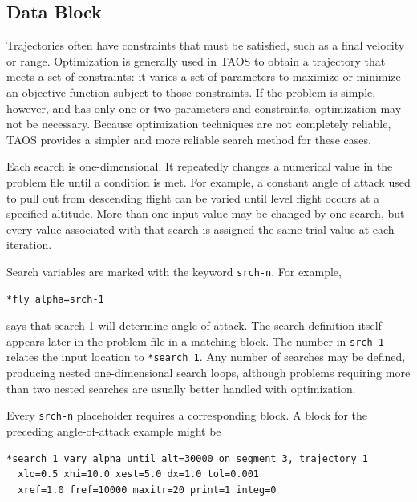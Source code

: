 \subsection{ Data Block}\label{sec:block-search}

Trajectories often have constraints that must be satisfied, such as a final velocity or
range. Optimization is generally used in TAOS to obtain a trajectory that meets a set
of constraints: it varies a set of parameters to maximize or minimize an objective
function subject to those constraints. If the problem is simple, however, and has only
one or two parameters and constraints, optimization may not be necessary. Because
optimization techniques are not completely reliable, TAOS provides a simpler and
more reliable search method for these cases.


Each search is one-dimensional. It repeatedly changes a numerical value in the
problem file until a condition is met. For example, a constant angle of attack used to
pull out from descending flight can be varied until level flight occurs at a specified
altitude. More than one input value may be changed by one search, but every value
associated with that search is assigned the same trial value at each iteration.

Search variables are marked with the keyword \texttt{srch-n}. For example,

\begin{lstlisting}[style=taosmanual]
*fly alpha=srch-1
\end{lstlisting}

says that search 1 will determine angle of attack. The search definition itself appears
later in the problem file in a matching  block. The number in
\texttt{srch-1} relates the input location to \texttt{*search 1}. Any number of searches
may be defined, producing nested one-dimensional search loops, although problems
requiring more than two nested searches are usually better handled with optimization.


Every \texttt{srch-n} placeholder requires a corresponding
 block. A block for the preceding angle-of-attack example
might be

\begin{lstlisting}[style=taosmanual]
*search 1 vary alpha until alt=30000 on segment 3, trajectory 1
  xlo=0.5 xhi=10.0 xest=5.0 dx=1.0 tol=0.001
  xref=1.0 fref=10000 maxitr=20 print=1 integ=0
\end{lstlisting}

